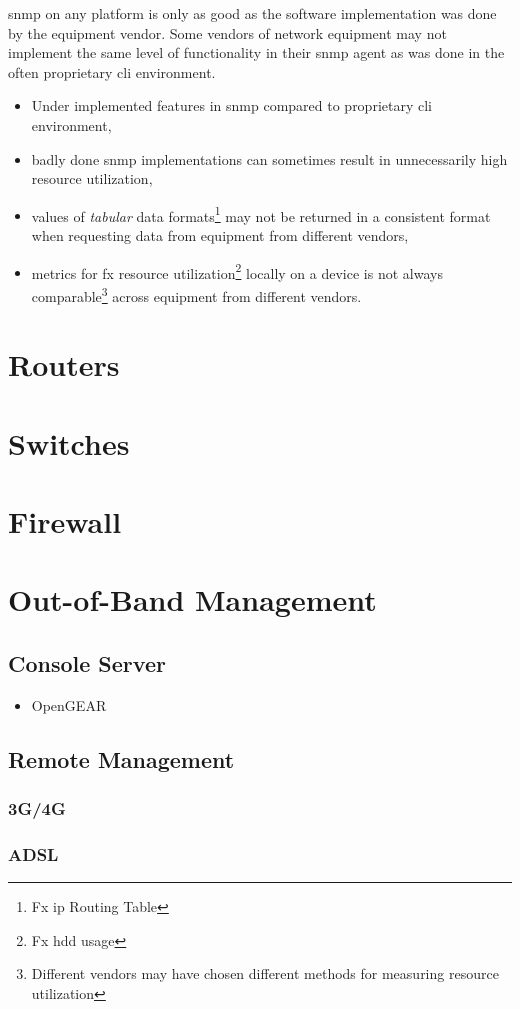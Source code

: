 \gls{snmp} on any platform is only as good as the software implementation was done by the equipment vendor. Some vendors of network equipment may not implement the same level of functionality in their \gls{snmp} agent as was done in the often proprietary \gls{cli} environment.\cite{wiki:Simple_Network_Management_Protocol}

\begin{itemize}
	\item Under implemented  features in \gls{snmp} compared to proprietary \gls{cli} environment,
	\item badly done \gls{snmp} implementations can sometimes result in unnecessarily high resource utilization,
	\item values of \textit{tabular} data formats\footnote{Fx \gls{ip} Routing Table} may not be returned in a consistent format when requesting data from equipment from different vendors,
	\item metrics for fx resource utilization\footnote{Fx hdd usage} locally on a device is not always comparable\footnote{Different vendors may have chosen different methods for measuring resource utilization} across equipment from different vendors.
\end{itemize}

\section{Routers}

\section{Switches}

\section{Firewall}

\section[OOB Mgmt]{Out-of-Band Management}

\subsection{Console Server}

\begin{itemize}
	\item OpenGEAR
\end{itemize}

\subsection[Remote Mgmt]{Remote Management}

\subsubsection{3G/4G}

\subsubsection{ADSL}
